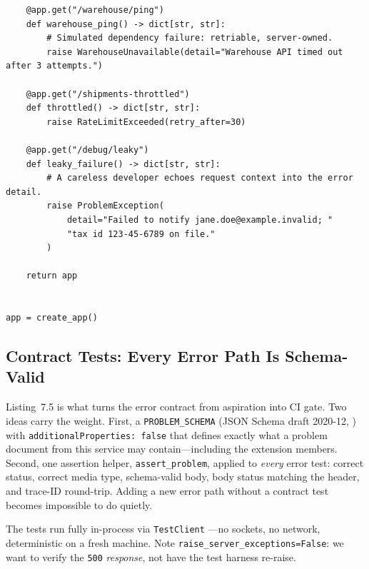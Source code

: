 \begin{verbatim}
    @app.get("/warehouse/ping")
    def warehouse_ping() -> dict[str, str]:
        # Simulated dependency failure: retriable, server-owned.
        raise WarehouseUnavailable(detail="Warehouse API timed out after 3 attempts.")

    @app.get("/shipments-throttled")
    def throttled() -> dict[str, str]:
        raise RateLimitExceeded(retry_after=30)

    @app.get("/debug/leaky")
    def leaky_failure() -> dict[str, str]:
        # A careless developer echoes request context into the error detail.
        raise ProblemException(
            detail="Failed to notify jane.doe@example.invalid; "
            "tax id 123-45-6789 on file."
        )

    return app


app = create_app()
\end{verbatim}

\subsection{Contract Tests: Every Error Path Is Schema-Valid}

Listing~7.5 is what turns the error contract from aspiration into CI gate.
Two ideas carry the weight. First, a \texttt{PROBLEM\_SCHEMA} (JSON Schema
draft 2020-12, \cite{jsonschemadocs}) with
\texttt{additionalProperties: false} that defines exactly what a problem
document from this service may contain---including the extension members.
Second, one assertion helper, \texttt{assert\_problem}, applied to
\emph{every} error test: correct status, correct media type, schema-valid
body, body status matching the header, and trace-ID round-trip. Adding a new
error path without a contract test becomes impossible to do quietly.

The tests run fully in-process via \texttt{TestClient}
\cite{fastapidocs}---no sockets, no network, deterministic on a fresh
machine. Note \texttt{raise\_server\_exceptions=False}: we want to verify
the \texttt{500} \emph{response}, not have the test harness re-raise.

